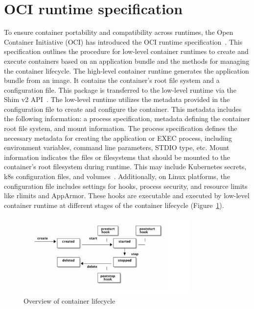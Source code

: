 \section{OCI runtime specification}

To ensure container portability and compatibility across runtimes, the Open Container Initiative (OCI) has introduced the OCI runtime specification~\cite*{oci-runtime-spec}. This specification outlines the procedure for low-level container runtimes to create and execute containers based on an 
application bundle and the methods for managing the container lifecycle. The high-level container runtime generates the application bundle from an image. It contains the container's root file system and a configuration file. This package is transferred to the low-level runtime via the Shim v2 API~\cite*{shim_v2}. 
The low-level runtime utilizes the metadata provided in the configuration file to create and configure the container. This metadata includes the following information: a process specification, metadata defining the container root file system, and mount information. The process specification defines 
the necessary metadata for creating the application or EXEC process, including environment variables, command line parameters, STDIO type, etc. Mount information indicates the files or filesystems that should be mounted to the container's root filesystem during runtime. This may include 
Kubernetes secrets, k8s configuration files, and volumes~\cite*{k8s}. Additionally, on Linux platforms, the configuration file includes settings for hooks,  process security, and resource limits like rlimits and  AppArmor. These hooks are executable and executed by low-level container runtime at 
different stages of the container lifecycle (Figure~\ref{fig:Container_Lifecycle_state}).
\begin{figure}[htp]
  \centering
  \includegraphics[width=0.8\textwidth]{images/Container_Lifecycle_state.PNG}
  \caption[Overview of container lifecycle]{Overview of container lifecycle}
  \label{fig:Container_Lifecycle_state}
\end{figure}

